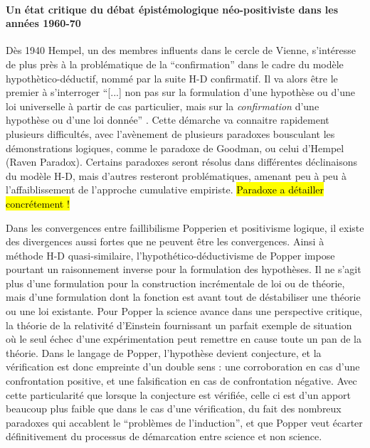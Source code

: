 \paragraph{Un état critique du débat épistémologique néo-positiviste dans les années 1960-70}
\label{p:critique_debat}

Dès 1940 Hempel, un des membres influents dans le cercle de Vienne, s'intéresse de plus près à la problématique de la \enquote{confirmation} dans le cadre du modèle hypothètico-déductif, nommé par la suite H-D confirmatif. Il va alors être le premier à s'interroger \enquote{[...] non pas sur la formulation d'une hypothèse ou d'une loi universelle à partir de cas particulier, mais sur la \textit{confirmation} d'une hypothèse ou d'une loi donnée} \autocite{Lecourt2006}. Cette démarche va connaitre rapidement plusieurs difficultés, avec l’avènement de plusieurs paradoxes bousculant les démonstrations logiques, comme le paradoxe de Goodman, ou celui d'Hempel (Raven Paradox). Certains paradoxes seront résolus dans différentes déclinaisons du modèle H-D, mais d'autres resteront problématiques, amenant peu à peu à l'affaiblissement de l'approche cumulative empiriste. \hl{Paradoxe a détailler concrétement !}

Dans les convergences entre faillibilisme Popperien et positivisme logique, il existe des divergences aussi fortes que ne peuvent être les convergences. Ainsi à méthode H-D quasi-similaire, l'hypothético-déductivisme de Popper impose pourtant un raisonnement inverse pour la formulation des hypothèses. Il ne s'agit plus d'une formulation pour la construction incrémentale de loi ou de théorie, mais d'une formulation dont la fonction est avant tout de déstabiliser une théorie ou une loi existante. Pour Popper la science avance dans une perspective critique, la théorie de la relativité d'Einstein fournissant un parfait exemple de situation où le seul échec d'une expérimentation peut remettre en cause toute un pan de la théorie. Dans le langage de Popper, l'hypothèse devient conjecture, et la vérification est donc empreinte d'un double sens : une corroboration en cas d'une confrontation positive, et une falsification en cas de confrontation négative. Avec cette particularité que lorsque la conjecture est vérifiée, celle ci est d'un apport beaucoup plus faible que dans le cas d'une vérification, du fait des nombreux paradoxes qui accablent le \enquote{problèmes de l'induction}, et que Popper veut écarter définitivement du processus de démarcation entre science et non science.

